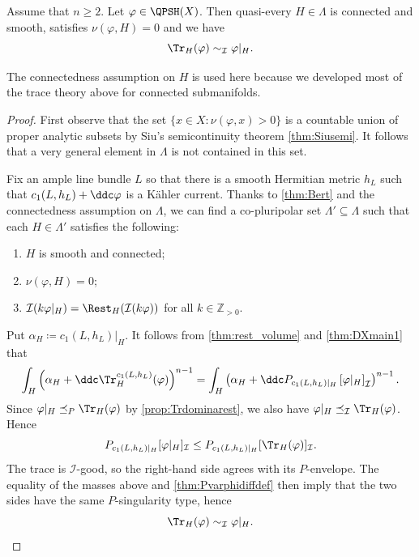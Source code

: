 \begin{corollary}\label{cor:ABTfortrace}
    Assume that $n\geq 2$.
    Let $\varphi\in \QPSH(X)$. Then quasi-every $H\in \Lambda$ is connected and smooth, satisfies $\nu(\varphi,H)=0$ and we have
    \[
    \Tr_H(\varphi)\sim_{\mathcal{I}} \varphi|_H.
    \]
\end{corollary}
The connectedness assumption on $H$ is used here because we developed most of the trace theory above for connected submanifolds.
\begin{proof}
    First observe that the set $\{x\in X:\nu(\varphi,x)>0\}$ is a countable union of proper analytic subsets by Siu's semicontinuity theorem \cref{thm:Siusemi}. It follows that a very general element in $\Lambda$ is not contained in this set.

    Fix an ample line bundle $L$ so that there is a smooth Hermitian metric $h_L$ such that $c_1(L,h_L)+\ddc \varphi$ is a Kähler current. Thanks to \cref{thm:Bert} and the connectedness assumption on $\Lambda$, we can find a co-pluripolar set $\Lambda'\subseteq \Lambda$ such that each $H\in \Lambda'$ satisfies the following:
    \begin{enumerate}
        \item\label{itm:chapter-trace:L946:1} $H$ is smooth and connected;
        \item\label{itm:chapter-trace:L946:2} $\nu(\varphi,H)=0$;
        \item\label{itm:chapter-trace:L946:3} $\mathcal{I}(k\varphi|_H)=\Rest_{H}(\mathcal{I}(k\varphi))$ for all $k\in \mathbb{Z}_{>0}$.
    \end{enumerate}
    Put $\alpha_H\coloneqq c_1(L,h_L)|_H$. It follows from \cref{thm:rest_volume} and \cref{thm:DXmain1} that
    \[
    \int_H \left( \alpha_H+\ddc \Tr_H^{c_1(L,h_L)}(\varphi)\right)^{n-1}
    =
    \int_H \left( \alpha_H+\ddc P_{c_1(L,h_L)|_H}\left[\varphi|_H\right]_{\mathcal{I}}  \right)^{n-1}.
    \]
    Since $\varphi|_H\preceq_P \Tr_H(\varphi)$ by \cref{prop:Trdominarest}, we also have $\varphi|_H\preceq_{\mathcal I}\Tr_H(\varphi)$. Hence
    \[
        P_{c_1(L,h_L)|_H}[\varphi|_H]_{\mathcal I}\leq P_{c_1(L,h_L)|_H}[\Tr_H(\varphi)]_{\mathcal I}.
    \]
    The trace is $\mathcal I$-good, so the right-hand side agrees with its $P$-envelope. The equality of the masses above and \cref{thm:Pvarphidiffdef} then imply that the two sides have the same $P$-singularity type, hence
    \[
        \Tr_H(\varphi)\sim_{\mathcal I}\varphi|_H.
    \]
\end{proof}




